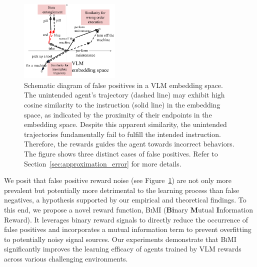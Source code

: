\documentclass{article}
\theoremstyle{plain}
\theoremstyle{definition}
\theoremstyle{remark}
\begin{document}
\begin{figure}
    \begin{center}
	\includegraphics[width=0.43\textwidth]{figures/illustration_of_false_positives.pdf}
	\end{center}
	\caption{Schematic diagram of false positives in a VLM embedding space. The unintended agent's trajectory (dashed line) may exhibit high cosine similarity to the instruction (solid line) in the embedding space, as indicated by the proximity of their endpoints in the embedding space. Despite this apparent similarity, the unintended trajectories fundamentally fail to fulfill the intended instruction. Therefore, the rewards guides the agent towards incorrect behaviors. The figure shows three distinct cases of false positives. Refer to Section~\ref{sec:approximation_error} for more details.}
	\label{fig:false_positive_issue}
\end{figure}

We posit that false positive reward noise (see Figure~\ref{fig:false_positive_issue}) are not only more prevalent but potentially more detrimental to the learning process than false negatives, a hypothesis supported by our empirical and theoretical findings. To this end, we propose a novel reward function, \textsc{BiMI} (\textbf{Bi}nary \textbf{M}utual \textbf{I}nformation Reward). It leverages binary reward signals to directly reduce the occurrence of false positives and incorporates a mutual information term to prevent overfitting to potentially noisy signal sources. Our experiments demonstrate that \textsc{BiMI} significantly improves the learning efficacy of agents trained by VLM rewards across various challenging environments.




\end{document}
